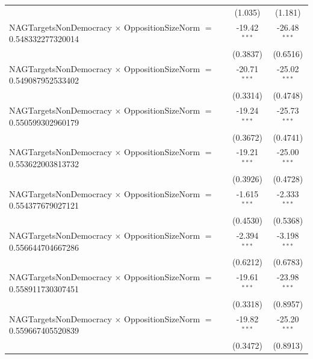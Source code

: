 \begin{tabular}{lcc}
                                                                                & (1.035)              & (1.181)\\   
   NAGTargetsNonDemocracy $\times$ OppositionSizeNorm $=$ 0.548332277320014     & -19.42$^{***}$       & -26.48$^{***}$\\   
                                                                                & (0.3837)             & (0.6516)\\   
   NAGTargetsNonDemocracy $\times$ OppositionSizeNorm $=$ 0.549087952533402     & -20.71$^{***}$       & -25.02$^{***}$\\   
                                                                                & (0.3314)             & (0.4748)\\   
   NAGTargetsNonDemocracy $\times$ OppositionSizeNorm $=$ 0.550599302960179     & -19.24$^{***}$       & -25.73$^{***}$\\   
                                                                                & (0.3672)             & (0.4741)\\   
   NAGTargetsNonDemocracy $\times$ OppositionSizeNorm $=$ 0.553622003813732     & -19.21$^{***}$       & -25.00$^{***}$\\   
                                                                                & (0.3926)             & (0.4728)\\   
   NAGTargetsNonDemocracy $\times$ OppositionSizeNorm $=$ 0.554377679027121     & -1.615$^{***}$       & -2.333$^{***}$\\   
                                                                                & (0.4530)             & (0.5368)\\   
   NAGTargetsNonDemocracy $\times$ OppositionSizeNorm $=$ 0.556644704667286     & -2.394$^{***}$       & -3.198$^{***}$\\   
                                                                                & (0.6212)             & (0.6783)\\   
   NAGTargetsNonDemocracy $\times$ OppositionSizeNorm $=$ 0.558911730307451     & -19.61$^{***}$       & -23.98$^{***}$\\   
                                                                                & (0.3318)             & (0.8957)\\   
   NAGTargetsNonDemocracy $\times$ OppositionSizeNorm $=$ 0.559667405520839     & -19.82$^{***}$       & -25.20$^{***}$\\   
                                                                                & (0.3472)             & (0.8913)\\   

\end{tabular}
